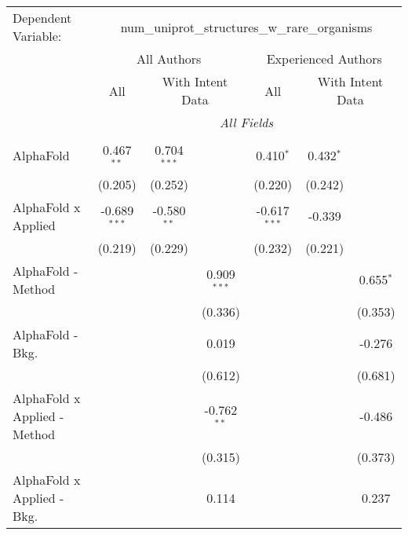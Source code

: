 \begingroup
\centering
\begin{tabular}{lcccccc}
   \tabularnewline \midrule \midrule
   Dependent Variable: & \multicolumn{6}{c}{num\_uniprot\_structures\_w\_rare\_organisms}\\
 & \multicolumn{3}{c}{All Authors} & \multicolumn{3}{c}{Experienced Authors} \\
\cmidrule(lr){2-4} \cmidrule(lr){5-7}
 & \multicolumn{1}{c}{All} & \multicolumn{2}{c}{With Intent Data} & \multicolumn{1}{c}{All} & \multicolumn{2}{c}{With Intent Data} \\
\cmidrule(lr){2-2} \cmidrule(lr){3-4} \cmidrule(lr){5-5} \cmidrule(lr){6-7}
 & \multicolumn{6}{c}{\textit{All Fields}} \\ \\
   AlphaFold                      & 0.467$^{**}$   & 0.704$^{***}$ &               & 0.410$^{*}$    & 0.432$^{*}$   &   \\   
                                  & (0.205)        & (0.252)       &               & (0.220)        & (0.242)       &   \\   
   AlphaFold x Applied            & -0.689$^{***}$ & -0.580$^{**}$ &               & -0.617$^{***}$ & -0.339        &   \\   
                                  & (0.219)        & (0.229)       &               & (0.232)        & (0.221)       &   \\   
   AlphaFold - Method             &                &               & 0.909$^{***}$ &                &               & 0.655$^{*}$\\   
                                  &                &               & (0.336)       &                &               & (0.353)\\   
   AlphaFold - Bkg.               &                &               & 0.019         &                &               & -0.276\\   
                                  &                &               & (0.612)       &                &               & (0.681)\\   
   AlphaFold x Applied - Method   &                &               & -0.762$^{**}$ &                &               & -0.486\\   
                                  &                &               & (0.315)       &                &               & (0.373)\\   
   AlphaFold x Applied - Bkg.     &                &               & 0.114         &                &               & 0.237\\   

\end{tabular}
